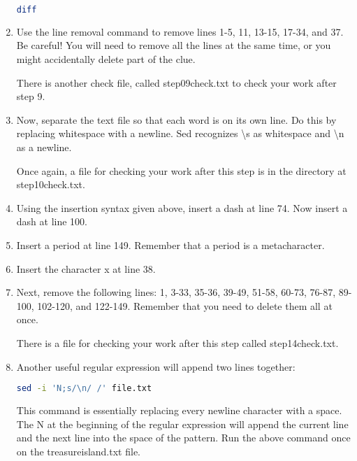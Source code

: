 \documentclass[11pt,a4paper]{article}
\begin{document}
\begin{enumerate}
\begin{lstlisting}[basicstyle=\ttfamily, backgroundcolor = \color{lightgray}, language = bash, xleftmargin = 0cm, framexleftmargin = 1em, breaklines=true]
diff 
\end{lstlisting}

\item Use the line removal command to remove lines 1-5, 11, 13-15, 17-34, and 37. Be careful! You will need to remove all the lines at the same time, or you might accidentally delete part of the clue.

There is another check file, called step09check.txt to check your work after step 9.

\item Now, separate the text file so that each word is on its own line. Do this by replacing whitespace with a newline. Sed recognizes \textbackslash s as whitespace and \textbackslash n as
a newline.

Once again, a file for checking your work after this step is in the directory at step10check.txt.

\item Using the insertion syntax given above, insert a dash at line 74. Now insert a dash at line 100.

\item Insert a period at line 149. Remember that a period is a metacharacter.

\item Insert the character x at line 38.

\item Next, remove the following lines: 1, 3-33, 35-36, 39-49, 51-58, 60-73, 76-87, 89-100, 102-120, and 122-149. Remember that you need to delete them all at once.

There is a file for checking your work after this step called step14check.txt.

\item Another useful regular expression will append two lines together:

\begin{lstlisting}[basicstyle=\ttfamily, backgroundcolor = \color{lightgray}, language = bash, xleftmargin = 0cm, framexleftmargin = 1em, breaklines=true]
sed -i 'N;s/\n/ /' file.txt
\end{lstlisting}

This command is essentially replacing every newline character with a space. The N at the beginning of the regular expression will append the current line and the next line into the space of the pattern. Run the above command once on the treasureisland.txt file.


\end{enumerate}
\end{document}

